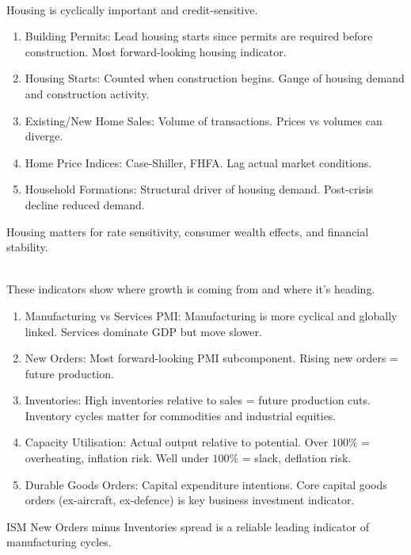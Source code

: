 \begin{remark} \\
Housing is cyclically important and credit-sensitive.
\begin{enumerate}[label=\roman*.]
\setlength{\itemsep}{0pt}
\item Building Permits: Lead housing starts since permits are required before construction. Most forward-looking housing indicator.
\item Housing Starts: Counted when construction begins. Gauge of housing demand and construction activity.
\item Existing/New Home Sales: Volume of transactions. Prices vs volumes can diverge.
\item Home Price Indices: Case-Shiller, FHFA. Lag actual market conditions.
\item Household Formations: Structural driver of housing demand. Post-crisis decline reduced demand.
\end{enumerate}
Housing matters for rate sensitivity, consumer wealth effects, and financial stability.
\end{remark}

\begin{remark} \\
These indicators show where growth is coming from and where it's heading.
\begin{enumerate}[label=\roman*.]
\setlength{\itemsep}{0pt}
\item Manufacturing vs Services PMI: Manufacturing is more cyclical and globally linked. Services dominate GDP but move slower.
\item New Orders: Most forward-looking PMI subcomponent. Rising new orders = future production.
\item Inventories: High inventories relative to sales = future production cuts. Inventory cycles matter for commodities and industrial equities.
\item Capacity Utilisation: Actual output relative to potential. Over $100\%$ = overheating, inflation risk. Well under $100\%$ = slack, deflation risk.
\item Durable Goods Orders: Capital expenditure intentions. Core capital goods orders (ex-aircraft, ex-defence) is key business investment indicator.
\end{enumerate}
ISM New Orders minus Inventories spread is a reliable leading indicator of manufacturing cycles.
\end{remark}

